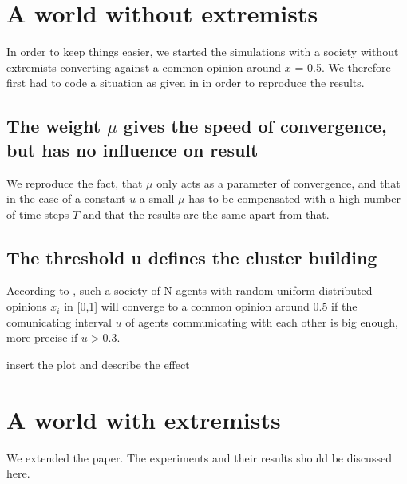 \documentclass[11pt]{article}
\begin{document}
\section{A world without extremists}
In order to keep things easier, we started the simulations with a society without extremists converting against a common opinion around $x$ = 0.5. We therefore first had to code a situation as given in \cite{Minor} in order to reproduce the results.

\subsection{The weight \texorpdfstring{$\mu$}{TEXT} gives the speed of convergence, but has no influence on result}
We reproduce the fact, that $\mu$ only acts as a parameter of convergence, and that in the case of a constant $u$ a small $\mu$ has to be compensated with a high number of time steps $T$ and that the results are the same apart from that.


\subsection{The threshold u defines the cluster building}
According to \cite{Minor}, such a society of N agents with random uniform distributed opinions $x_i$ in [0,1] will converge to a common opinion around 0.5 if the comunicating interval $u$ of agents communicating with each other is big enough, more precise if $u>0.3$.

insert the plot and describe the effect

\section{A world with extremists}
We extended the paper. The experiments and their results should be discussed here.
\end{document}
